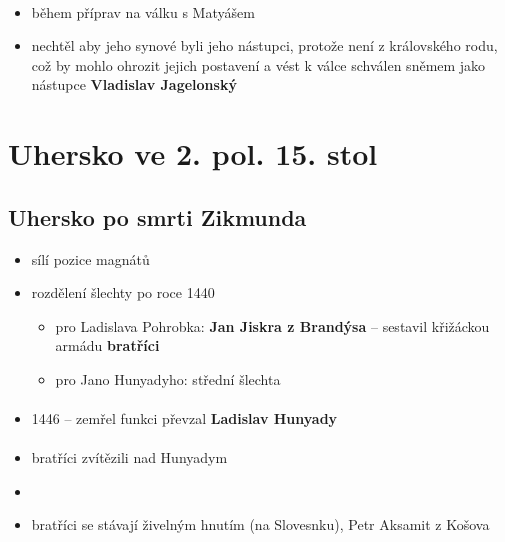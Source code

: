 \paragraph{}
\begin{itemize}
\item během příprav na válku s Matyášem
\item nechtěl aby jeho synové byli jeho nástupci, protože není z královského rodu, což by mohlo ohrozit jejich postavení a vést k válce  schválen sněmem jako nástupce \textbf{Vladislav Jagelonský}
\end{itemize}



\section{Uhersko ve 2. pol. 15. stol}
\subsection{Uhersko po smrti Zikmunda}
\begin{itemize}
\item sílí pozice magnátů
\item rozdělení šlechty po roce 1440
	\begin{itemize}
	\item pro Ladislava Pohrobka: \textbf{Jan Jiskra z Brandýsa} -- sestavil křižáckou armádu \textbf{bratříci}
	\item pro Jano Hunyadyho: střední šlechta
	\end{itemize}
\end{itemize}

\paragraph{}
\begin{itemize}
\item 1446 -- zemřel \ra funkci převzal \textbf{Ladislav Hunyady}
\end{itemize}

\paragraph{}
\begin{itemize}
\item bratříci zvítězili nad Hunyadym 
\item {}
\item bratříci se stávají živelným hnutím (na Slovesnku), Petr Aksamit z Košova
\end{itemize}

